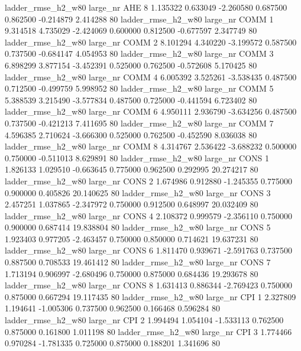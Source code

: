  ladder_rmse_h2_w80   large_nr      AHE                 8  1.135322  0.633049  -2.260580 0.687500 0.862500 -0.214879    2.414288 80
 ladder_rmse_h2_w80   large_nr     COMM                 1  9.314518  4.735029  -2.424069 0.600000 0.812500 -0.677597    2.347749 80
 ladder_rmse_h2_w80   large_nr     COMM                 2  8.101294  4.340220  -3.199572 0.587500 0.737500 -0.684147    4.054953 80
 ladder_rmse_h2_w80   large_nr     COMM                 3  6.898299  3.877154  -3.452391 0.525000 0.762500 -0.572608    5.170425 80
 ladder_rmse_h2_w80   large_nr     COMM                 4  6.005392  3.525261  -3.538435 0.487500 0.712500 -0.499759    5.998952 80
 ladder_rmse_h2_w80   large_nr     COMM                 5  5.388539  3.215490  -3.577834 0.487500 0.725000 -0.441594    6.723402 80
 ladder_rmse_h2_w80   large_nr     COMM                 6  4.950111  2.936790  -3.634256 0.487500 0.737500 -0.421213    7.411695 80
 ladder_rmse_h2_w80   large_nr     COMM                 7  4.596385  2.710624  -3.666300 0.525000 0.762500 -0.452590    8.036038 80
 ladder_rmse_h2_w80   large_nr     COMM                 8  4.314767  2.536422  -3.688232 0.500000 0.750000 -0.511013    8.629891 80
 ladder_rmse_h2_w80   large_nr     CONS                 1  1.826133  1.029510  -0.663645 0.775000 0.962500  0.292995   20.274217 80
 ladder_rmse_h2_w80   large_nr     CONS                 2  1.674986  0.912880  -1.245355 0.775000 0.900000  0.405826   20.140625 80
 ladder_rmse_h2_w80   large_nr     CONS                 3  2.457251  1.037865  -2.347972 0.750000 0.912500  0.648997   20.032409 80
 ladder_rmse_h2_w80   large_nr     CONS                 4  2.108372  0.999579  -2.356110 0.750000 0.900000  0.687414   19.838804 80
 ladder_rmse_h2_w80   large_nr     CONS                 5  1.923403  0.977205  -2.463457 0.750000 0.850000  0.714621   19.637231 80
 ladder_rmse_h2_w80   large_nr     CONS                 6  1.811470  0.939671  -2.591763 0.737500 0.887500  0.708533   19.461412 80
 ladder_rmse_h2_w80   large_nr     CONS                 7  1.713194  0.906997  -2.680496 0.750000 0.875000  0.684436   19.293678 80
 ladder_rmse_h2_w80   large_nr     CONS                 8  1.631413  0.886344  -2.769423 0.750000 0.875000  0.667294   19.117435 80
 ladder_rmse_h2_w80   large_nr      CPI                 1  2.327809  1.194641  -1.005306 0.737500 0.962500  0.166468    0.596284 80
 ladder_rmse_h2_w80   large_nr      CPI                 2  1.994494  1.054104  -1.533113 0.762500 0.875000  0.161800    1.011198 80
 ladder_rmse_h2_w80   large_nr      CPI                 3  1.774466  0.970284  -1.781335 0.725000 0.875000  0.188201    1.341696 80
